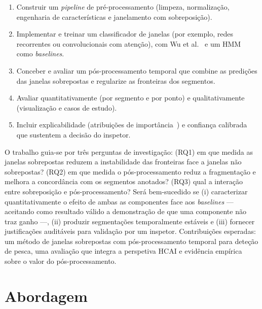 \documentclass{article}
\begin{document}
\begin{enumerate}
    \item Construir um \emph{pipeline} de pré-processamento (limpeza, normalização, engenharia de características e janelamento com sobreposição).
    \item Implementar e treinar um classificador de janelas (por exemplo, redes recorrentes ou convolucionais com atenção), com Wu et al.~ e um HMM~\cite{peel2011} como \emph{baselines}.
    \item Conceber e avaliar um pós-processamento temporal que combine as predições das janelas sobrepostas e regularize as fronteiras dos segmentos.
    \item Avaliar quantitativamente (por segmento e por ponto) e qualitativamente (visualização e casos de estudo).
    \item Incluir explicabilidade (atribuições de importância~\cite{lundberg2017}) e confiança calibrada~\cite{guo2017} que sustentem a decisão do inspetor.
\end{enumerate}

O trabalho guia-se por três perguntas de investigação: (RQ1) em que medida as janelas sobrepostas reduzem a instabilidade das fronteiras face a janelas não sobrepostas? (RQ2) em que medida o pós-processamento reduz a fragmentação e melhora a concordância com os segmentos anotados? (RQ3) qual a interação entre sobreposição e pós-processamento? Será bem-sucedido se (i) caracterizar quantitativamente o efeito de ambas as componentes face aos \emph{baselines} --- aceitando como resultado válido a demonstração de que uma componente não traz ganho ---, (ii) produzir segmentações temporalmente estáveis e (iii) fornecer justificações auditáveis para validação por um inspetor. Contribuições esperadas: um método de janelas sobrepostas com pós-processamento temporal para deteção de pesca, uma avaliação que integra a perspetiva HCAI e evidência empírica sobre o valor do pós-processamento.

\section{Abordagem}
\label{sec:abordagem}
\end{document}
